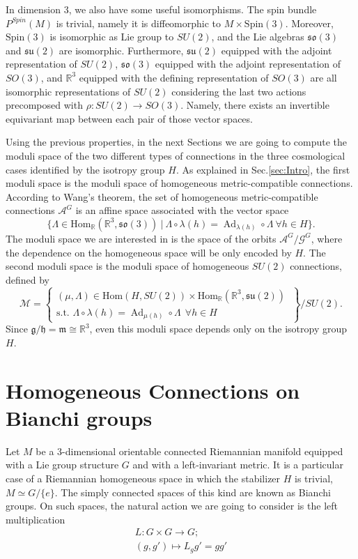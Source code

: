 \documentclass{article}
\numberwithin{equation}{section}
\theoremstyle{definition}
\newcommand{\R}{\mathbb{R}}
\newcommand{\g}{\mathfrak{g}}
\newcommand{\A}{\mathcal{A}}
\newcommand{\su}[1]{\mathfrak{su}(#1)}
\newcommand{\so}[1]{\mathfrak{so}(#1)}
\newcommand{\SP}[1]{P^{Spin}(#1)}
\newcommand{\Ad}{\operatorname{Ad}}
\begin{document}
\medskip

In dimension 3, we also have some useful isomorphisms. The spin bundle $\SP{M}$ is trivial, namely it is diffeomorphic to $M\times \mathrm{Spin}(3)$. Moreover, $\mathrm{Spin}(3)$ is isomorphic as Lie group to $SU(2)$, and the Lie algebras $\so{3}$ and $\su{2}$ are isomorphic. Furthermore,  $\su{2}$ equipped with the adjoint representation of $SU(2)$, $\so{3}$ equipped with the adjoint representation of $SO(3)$, and $\R^3$ equipped with the defining representation of $SO(3)$ are all isomorphic representations of $SU(2)$ considering the last two actions precomposed with $\rho:SU(2)\to SO(3)$. Namely, there exists an invertible equivariant map between each pair of those vector spaces.

\medskip

Using the previous properties, in the next Sections we are going to compute the moduli space of the two different types of connections in the three cosmological cases identified by the isotropy group $H$. As explained in Sec.\ref{sec:Intro}, the first moduli space is the moduli space of homogeneous metric-compatible connections. According to Wang's theorem, the set of homogeneous metric-compatible connections $\A^G$ is an affine space associated with the vector space
\begin{equation}
    \{\Lambda\in \mathrm{Hom}_{\R}(\R^3,\so{3})\ |\ \Lambda\circ \lambda(h)=\Ad_{\lambda(h)}\circ \Lambda\ \forall h\in H\}.
\end{equation}
The moduli space we are interested in is the space of the orbits $\A^G/\mathcal{G}^G$, where the dependence on the homogeneous space will be only encoded by $H$.
The second moduli space is the moduli space of homogeneous $SU(2)$ connections, defined by
\begin{equation}
    \label{moduli}
    \mathcal{M}=\left\{\begin{matrix}(\mu,\Lambda)\in \mathrm{Hom}(H,SU(2))\times \mathrm{Hom}_{\R}(\R^3,\su{2})\ \\ \mbox{s.t. }\Lambda\circ \lambda(h)=\Ad_{\mu(h)}\circ \Lambda\ \ \forall h\in H\end{matrix}\right\}/SU(2).
\end{equation}
Since $\g/\mathfrak{h}=\mathfrak{m}\cong\R^3$, even this moduli space depends only on the isotropy group $H$.

\section{Homogeneous Connections on Bianchi groups}
Let $M$ be a $3$-dimensional orientable connected Riemannian manifold equipped with a Lie group structure $G$ and with a left-invariant metric. It is a particular case of a Riemannian homogeneous space in which the stabilizer $H$ is trivial, $M\simeq G/\{e\}$. The simply connected spaces of this kind are known as Bianchi groups. On such spaces, the natural action we are going to consider is the left multiplication
\begin{align*}
    L:G\times G\to G;\\
    (g,g')\mapsto L_{g}g'=g g'
\end{align*}
\end{document}
